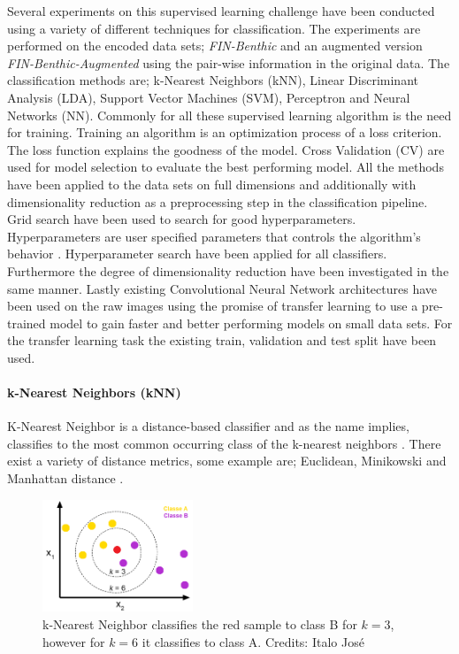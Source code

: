Several experiments on this supervised learning challenge have been conducted using a variety of different techniques for classification. The experiments are performed on the encoded data sets; \textit{FIN-Benthic} and an augmented version \textit{FIN-Benthic-Augmented} using the pair-wise information in the original data. The classification methods are; k-Nearest Neighbors (kNN), Linear Discriminant Analysis (LDA), Support Vector Machines (SVM), Perceptron and Neural Networks (NN). Commonly for all these supervised learning algorithm is the need for training. Training an algorithm is an optimization process of a loss criterion. The loss function explains the goodness of the model. Cross Validation (CV) are used for model selection to evaluate the best performing model. All the methods have been applied to the data sets on full dimensions and additionally with dimensionality reduction as a preprocessing step in the classification pipeline. Grid search have been used to search for good hyperparameters. Hyperparameters are user specified parameters that controls the algorithm's behavior \cite{Goodfellow-et-al-2016}. Hyperparameter search have been applied for all classifiers. Furthermore the degree of dimensionality reduction have been investigated in the same manner. Lastly existing Convolutional Neural Network architectures have been used on the raw images using the promise of transfer learning to use a pre-trained model to gain faster and better performing models on small data sets. For the transfer learning task the existing train, validation and test split have been used.

\paragraph{k-Nearest Neighbors (kNN)}

K-Nearest Neighbor is a distance-based classifier and as the name implies, classifies to the most common occurring class of the k-nearest neighbors \cite{karpathy}. There exist a variety of distance metrics, some example are; Euclidean, Minikowski and Manhattan distance \cite{AIML}. 

\begin{figure}[H]
    \centering
    \includegraphics[width=0.4\textwidth]{figures/knn.png}
    \caption[]{k-Nearest Neighbor classifies the red sample to class B for $k=3$, however for $k=6$ it classifies to class A. Credits: Italo José}
    \label{fig:knn}
\end{figure}

